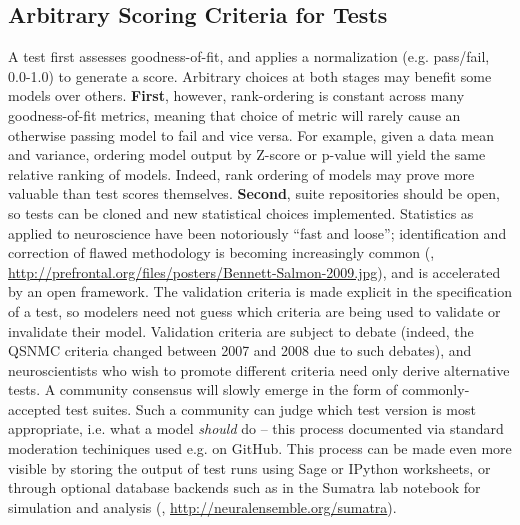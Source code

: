 \documentclass{frontiersSCNS}
\begin{document}
\subsection{Arbitrary Scoring Criteria for Tests}
A test first assesses goodness-of-fit, and applies a normalization (e.g. pass/fail, 0.0-1.0) to generate a score. 
Arbitrary choices at both stages may benefit some models over others.  \textbf{First}, however, rank-ordering is constant across many goodness-of-fit metrics, meaning that choice of metric will rarely cause an otherwise passing model to fail and vice versa. 
For example, given a data mean and variance, ordering model output by Z-score or p-value will yield the same relative ranking of models. 
Indeed, rank ordering of models may prove more valuable than test scores themselves. 
\textbf{Second}, suite repositories should be open, so tests can be cloned and new statistical choices implemented. 
Statistics as applied to neuroscience have been notoriously ``fast and loose''; 
identification and correction of flawed methodology is becoming increasingly common (\cite{button_power_2013,kriegeskorte_circular_2009,galbraith_study_2010}, \url{http://prefrontal.org/files/posters/Bennett-Salmon-2009.jpg}), and is accelerated by an open framework. 
The validation criteria is made explicit in the specification of a test, so modelers need not guess which criteria are being used to validate or invalidate their model. 
Validation criteria are subject to debate (indeed, the QSNMC criteria changed between 2007 and 2008 due to such debates), and neuroscientists who wish to promote different criteria need only derive alternative tests. 
A community consensus will slowly emerge in the form of commonly-accepted test suites. 
Such a community can judge which test version is most appropriate, i.e. what a model \textit{should} do -- this process documented via standard moderation techiniques used e.g. on GitHub.  This process can be made even more visible by storing the output of test runs using Sage or IPython worksheets, or through optional database backends such as in the Sumatra lab notebook for simulation and analysis (\cite{sumatra_davison_2012}, \url{http://neuralensemble.org/sumatra}).  
\end{document}
